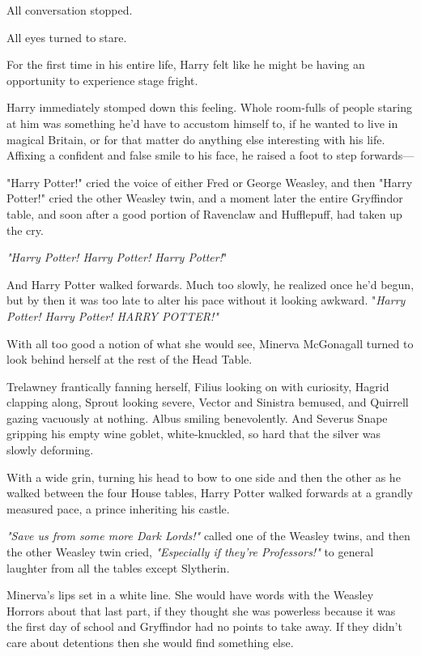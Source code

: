 All conversation stopped.

All eyes turned to stare.

For the first time in his entire life, Harry felt like he might be having an 
opportunity to experience stage fright.

Harry immediately stomped down this feeling. Whole room-fulls of people staring 
at him was something he'd have to accustom himself to, if he wanted to live in 
magical Britain, or for that matter do anything else interesting with his life. 
Affixing a confident and false smile to his face, he raised a foot to step 
forwards---

"Harry Potter!" cried the voice of either Fred or George Weasley, and then 
"Harry Potter!" cried the other Weasley twin, and a moment later the entire 
Gryffindor table, and soon after a good portion of Ravenclaw and Hufflepuff, 
had taken up the cry.

\emph{"Harry Potter! Harry Potter! Harry Potter!}"

And Harry Potter walked forwards. Much too slowly, he realized once he'd begun, 
but by then it was too late to alter his pace without it looking awkward.
\sbreak
"\emph{Harry Potter! Harry Potter! HARRY POTTER!"}

With all too good a notion of what she would see, Minerva McGonagall turned to 
look behind herself at the rest of the Head Table.

Trelawney frantically fanning herself, Filius looking on with curiosity, Hagrid 
clapping along, Sprout looking severe, Vector and Sinistra bemused, and 
Quirrell gazing vacuously at nothing. Albus smiling benevolently. And Severus 
Snape gripping his empty wine goblet, white-knuckled, so hard that the silver 
was slowly deforming.

With a wide grin, turning his head to bow to one side and then the other as he 
walked between the four House tables, Harry Potter walked forwards at a grandly 
measured pace, a prince inheriting his castle.

\emph{"Save us from some more Dark Lords!"} called one of the Weasley twins, 
and then the other Weasley twin cried, \emph{"Especially if they're 
Professors!"} to general laughter from all the tables except Slytherin.

Minerva's lips set in a white line. She would have words with the Weasley 
Horrors about that last part, if they thought she was powerless because it was 
the first day of school and Gryffindor had no points to take away. If they 
didn't care about detentions then she would find something else.

